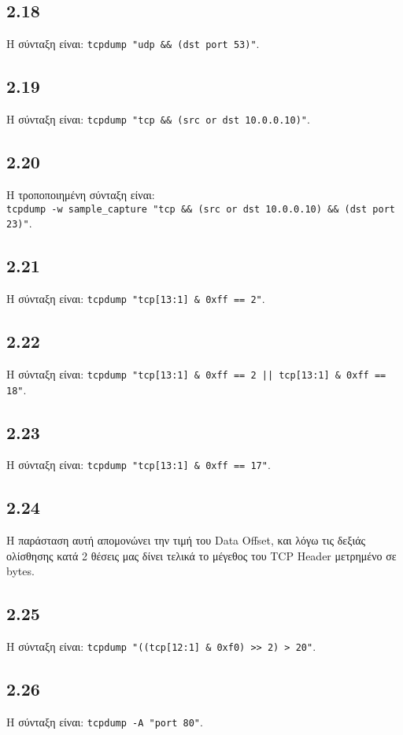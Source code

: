 \documentclass[a4paper, 12pt]{article}
\begin{document}
	\subsection*{2.18}
		Η σύνταξη είναι: \verb|tcpdump "udp && (dst port 53)"|.

	\subsection*{2.19}
		Η σύνταξη είναι: \verb|tcpdump "tcp && (src or dst 10.0.0.10)"|.

	\subsection*{2.20} 
		Η τροποποιημένη σύνταξη είναι: \\ \verb|tcpdump -w sample_capture "tcp && (src or dst 10.0.0.10) && (dst port 23)"|.

	\subsection*{2.21}
		Η σύνταξη είναι: \verb|tcpdump "tcp[13:1] & 0xff == 2"|.

	\subsection*{2.22}
		Η σύνταξη είναι: \verb+tcpdump "tcp[13:1] & 0xff == 2 || tcp[13:1] & 0xff == 18"+.
		
	\subsection*{2.23}
		Η σύνταξη είναι: \verb|tcpdump "tcp[13:1] & 0xff == 17"|.
		
	\subsection*{2.24}
		Η παράσταση αυτή απομονώνει την τιμή του Data Offset, και λόγω τις δεξιάς ολίσθησης κατά 2 θέσεις μας δίνει τελικά το μέγεθος του TCP Header μετρημένο σε bytes.

	\subsection*{2.25}
		Η σύνταξη είναι: \verb|tcpdump "((tcp[12:1] & 0xf0) >> 2) > 20"|.	

	\subsection*{2.26}
		Η σύνταξη είναι: \verb|tcpdump -A "port 80"|.
		
\end{document}

